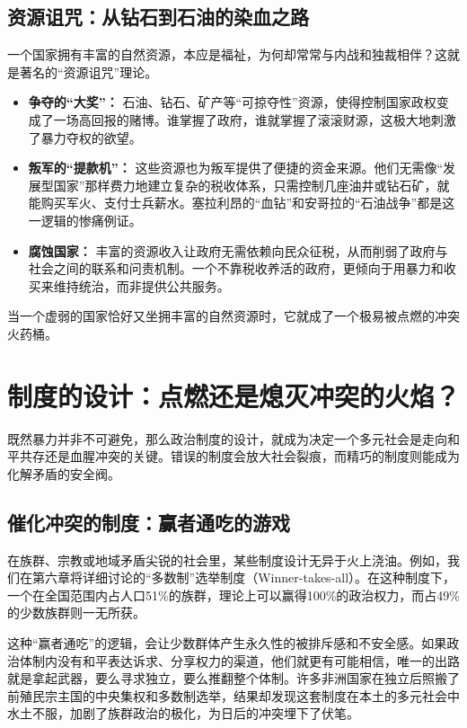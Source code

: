 \documentclass[a5paper, 11pt, openany]{ctexbook}
\begin{document}
\subsection{资源诅咒：从钻石到石油的染血之路}

一个国家拥有丰富的自然资源，本应是福祉，为何却常常与内战和独裁相伴？这就是著名的“资源诅咒”理论。
\begin{itemize}
    \item \textbf{争夺的“大奖”：} 石油、钻石、矿产等“可掠夺性”资源，使得控制国家政权变成了一场高回报的赌博。谁掌握了政府，谁就掌握了滚滚财源，这极大地刺激了暴力夺权的欲望。
    \item \textbf{叛军的“提款机”：} 这些资源也为叛军提供了便捷的资金来源。他们无需像“发展型国家”那样费力地建立复杂的税收体系，只需控制几座油井或钻石矿，就能购买军火、支付士兵薪水。塞拉利昂的“血钻”和安哥拉的“石油战争”都是这一逻辑的惨痛例证。
    \item \textbf{腐蚀国家：} 丰富的资源收入让政府无需依赖向民众征税，从而削弱了政府与社会之间的联系和问责机制。一个不靠税收养活的政府，更倾向于用暴力和收买来维持统治，而非提供公共服务。
\end{itemize}

当一个虚弱的国家恰好又坐拥丰富的自然资源时，它就成了一个极易被点燃的冲突火药桶。

\section{制度的设计：点燃还是熄灭冲突的火焰？}

既然暴力并非不可避免，那么政治制度的设计，就成为决定一个多元社会是走向和平共存还是血腥冲突的关键。错误的制度会放大社会裂痕，而精巧的制度则能成为化解矛盾的安全阀。

\subsection{催化冲突的制度：赢者通吃的游戏}

在族群、宗教或地域矛盾尖锐的社会里，某些制度设计无异于火上浇油。例如，我们在第六章将详细讨论的“多数制”选举制度（Winner-takes-all）。在这种制度下，一个在全国范围内占人口51\%的族群，理论上可以赢得100\%的政治权力，而占49\%的少数族群则一无所获。

这种“赢者通吃”的逻辑，会让少数群体产生永久性的被排斥感和不安全感。如果政治体制内没有和平表达诉求、分享权力的渠道，他们就更有可能相信，唯一的出路就是拿起武器，要么寻求独立，要么推翻整个体制。许多非洲国家在独立后照搬了前殖民宗主国的中央集权和多数制选举，结果却发现这套制度在本土的多元社会中水土不服，加剧了族群政治的极化，为日后的冲突埋下了伏笔。
\end{document}
